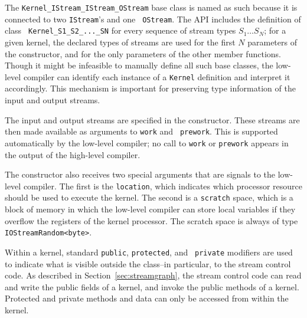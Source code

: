 The {\tt Kernel\_IStream\_IStream\_OStream} base class is named as
such because it is connected to two {\tt IStream}'s and one {\tt
OStream}.  The API includes the definition of class {\tt
Kernel\_S1\_S2\_...\_SN} for every sequence of stream types $S_1 \dots
S_N$; for a given kernel, the declared types of streams are used for
the first $N$ parameters of the constructor, and for the only
parameters of the other member functions.  Though it might be
infeasible to manually define all such base classes, the low-level
compiler can identify each instance of a {\tt Kernel} definition and
interpret it accordingly.  This mechanism is important for preserving
type information of the input and output streams.

The input and output streams are specified in the constructor.  These
streams are then made available as arguments to {\tt work} and {\tt
prework}.  This is supported automatically by the low-level compiler;
no call to {\tt work} or {\tt prework} appears in the output of the
high-level compiler.

The constructor also receives two special arguments that are signals to the low-level compiler.
The first is the {\tt location}, which indicates which processor resource should be used to
execute the kernel.  The second is a {\tt scratch} space, which is a block of memory in which
the low-level compiler can store local variables if they overflow the registers of the kernel
processor.  The scratch space is always of type {\tt IOStreamRandom<byte>}.

Within a kernel, standard {\tt public}, {\tt protected}, and {\tt
private} modifiers are used to indicate what is visible outside the
class--in particular, to the stream control code.  As described in
Section~\ref{sec:streamgraph}, the stream control code can read and
write the public fields of a kernel, and invoke the public methods of
a kernel.  Protected and private methods and data can only be accessed
from within the kernel.


